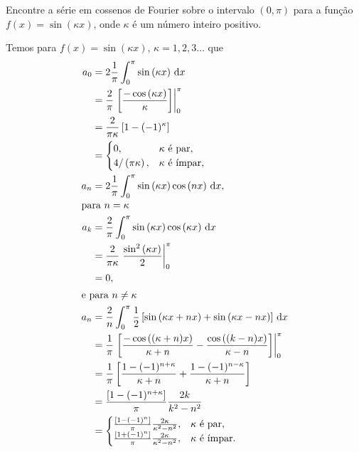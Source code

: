 \documentclass[a4paper,12pt, leqno, answers]{exam}
\begin{document}
\begin{questions}
  \question[T1 de 2011] Encontre a série em cossenos de Fourier sobre o intervalo $(0, \pi)$ para a função $f(x) = \sin\left( \kappa x \right)$, onde $\kappa$ é um n\'{u}mero inteiro positivo.
  \begin{solution}
    Temos para $f(x) = \sin\left( \kappa x \right)$, $\kappa = 1, 2, 3 \ldots$ que
    \begin{align*}
      a_0 &= 2 \frac{1}{\pi} \int_0^\pi \sin\left( \kappa x \right) \, \mathrm{d}x \\
      &= \frac{2}{\pi} \left. \left[ \frac{-\cos\left( \kappa x \right)}{\kappa} \right] \right|_0^\pi \\
      &= \frac{2}{\pi \kappa} \left[ 1 - (-1)^\kappa \right] \\
      &= \begin{cases}
        0, & \kappa \text{ é par}, \\
        4 / \left( \pi \kappa \right), & \kappa \text{ é \'{i}mpar},
      \end{cases} \\
      a_n &= 2 \frac{1}{\pi} \int_0^\pi \sin\left( \kappa x \right) \cos\left( n x \right) \, \mathrm{d}x, \\
      \intertext{para $n = \kappa$}
      a_k &= \frac{2}{\pi} \int_0^\pi \sin\left( \kappa x \right) \cos\left( \kappa x \right) \, \mathrm{d}x \\
      &= \frac{2}{\pi \kappa} \left. \frac{\sin^2\left( \kappa x \right)}{2} \right|_0^\pi \\
      &= 0, \\
      \intertext{e para $n \neq \kappa$}
      a_n &= \frac{2}{n} \int_0^\pi \frac{1}{2} \left[ \sin\left( \kappa x + n x \right) + \sin\left( \kappa x - n x \right) \right] \, \mathrm{d}x \\
      &= \frac{1}{\pi} \left. \left[ \frac{- \cos\left( (\kappa + n) x \right)}{\kappa + n} - \frac{\cos\left( (k - n) x \right)}{\kappa - n} \right] \right|_0^\pi \\
      &= \frac{1}{\pi} \left[ \frac{1 - (-1)^{n + \kappa}}{\kappa + n} + \frac{1 - (-1)^{n - \kappa}}{\kappa + n} \right] \\
      &= \frac{\left[ 1 - (-1)^{n + \kappa} \right]}{\pi} \frac{2 k}{k^2 - n^2} \\
      &= \begin{cases}
        \frac{\left[ 1 - (-1)^n \right]}{\pi} \frac{2 \kappa}{\kappa^2 - n^2}, & \kappa \text{ é par}, \\
        \frac{\left[ 1 + (-1)^n \right]}{\pi} \frac{2 \kappa}{\kappa^2 - n^2}, & \kappa \text{ é \'{i}mpar}.
      \end{cases}
    \end{align*}


\end{solution}
\end{questions}
\end{document}
